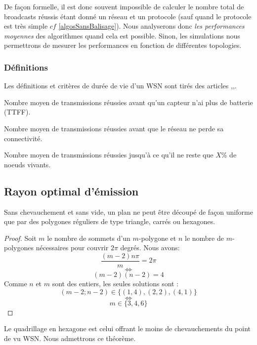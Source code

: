 De façon formelle, il est donc souvent impossible de calculer le nombre total de broadcasts réussis étant donné un réseau et un protocole (sauf quand le protocole est très simple $cf$ \ref{algosSansBalisage}). Nous analyserons 
donc \textit{les performances moyennes} des algorithmes quand cela est possible. Sinon, les simulations nous permettrons de mesurer les performances en fonction de différentes topologies.

\subsubsection{Définitions}
Les définitions et critères de durée de vie d'un WSN sont tirés des articles \cite{Dietrich2009},\cite{Champ2009lifetime},\cite{Elleithy2011}. 

\begin{mylt}
Nombre moyen de transmissions réussies avant qu'un capteur n'ai plus de batterie (TTFF).
\end{mylt}
\begin{mylt}
Nombre moyen de transmissions réussies avant que le réseau ne perde sa connectivité.
\end{mylt}
\begin{mylt}
Nombre moyen de transmissions réussies jusqu'à ce qu'il ne reste que $X\%$ de noeuds vivants.
\end{mylt}


\subsection{Rayon optimal d'émission}
\begin{myth}
Sans chevauchement et sans vide, un plan ne peut être découpé de façon uniforme que par des polygones réguliers de type triangle, carrés ou hexagones.
\end{myth}
\begin{proof}
Soit $m$ le nombre de sommets d'un $m$-polygone et $n$ le nombre de $m$-polygones nécessaires pour couvrir $2\pi$ degrés. Nous avons: 
$$\frac{(m-2)n\pi}{m}=2\pi$$
$$\Leftrightarrow$$
$$(m-2)(n-2)=4$$
Comme $n$ et $m$ sont des entiers, les seules solutions sont : 
$$(m-2;n-2)\in\{(1,4),(2,2),(4,1) \}$$
$$\Leftrightarrow$$
$$m \in \{ 3,4,6 \}$$
\end{proof}

\begin{myth}
Le quadrillage en hexagone est celui offrant le moins de chevauchements du point de vu WSN. Nous admettrons ce théorème.
\end{myth}

